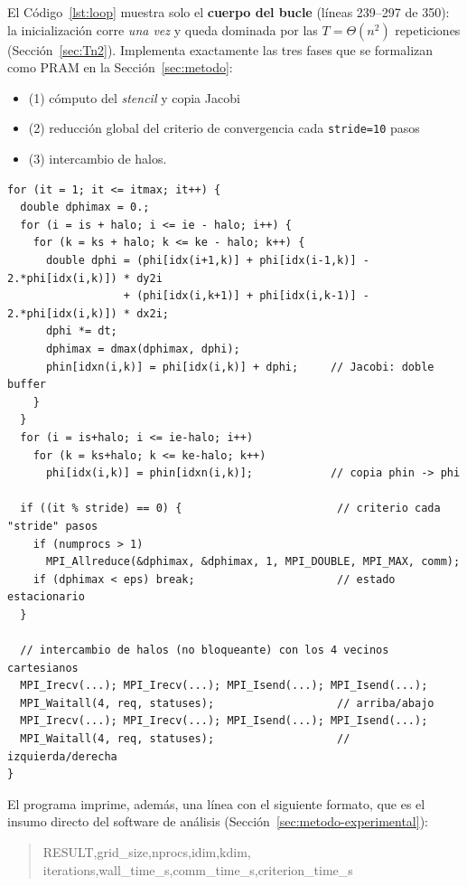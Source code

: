 \documentclass[11pt,a4paper]{article}
\begin{document}
	El Código~\ref{lst:loop} muestra solo el \textbf{cuerpo del bucle} (líneas
	239--297 de 350): la inicialización corre \emph{una vez} y queda dominada por
	las $T=\Theta(n^2)$ repeticiones (Sección~\ref{sec:Tn2}). Implementa
	exactamente las tres fases que se formalizan como PRAM en la
	Sección~\ref{sec:metodo}:
	\begin{itemize}
		\item (1) cómputo del \textit{stencil} y copia Jacobi
		\item (2) reducción global del criterio de convergencia	cada \texttt{stride=10} pasos
		\item (3) intercambio de halos.
	\end{itemize}


	\begin{lstlisting}[style=cppstyle, caption={Núcleo del bucle de iteración (\texttt{src/heat-mpi-big.c}, líneas 239--297, abreviado).}, label={lst:loop}]
for (it = 1; it <= itmax; it++) {
  double dphimax = 0.;
  for (i = is + halo; i <= ie - halo; i++) {
    for (k = ks + halo; k <= ke - halo; k++) {
      double dphi = (phi[idx(i+1,k)] + phi[idx(i-1,k)] - 2.*phi[idx(i,k)]) * dy2i
                  + (phi[idx(i,k+1)] + phi[idx(i,k-1)] - 2.*phi[idx(i,k)]) * dx2i;
      dphi *= dt;
      dphimax = dmax(dphimax, dphi);
      phin[idxn(i,k)] = phi[idx(i,k)] + dphi;     // Jacobi: doble buffer
    }
  }
  for (i = is+halo; i <= ie-halo; i++)
    for (k = ks+halo; k <= ke-halo; k++)
      phi[idx(i,k)] = phin[idxn(i,k)];            // copia phin -> phi

  if ((it % stride) == 0) {                        // criterio cada "stride" pasos
    if (numprocs > 1)
      MPI_Allreduce(&dphimax, &dphimax, 1, MPI_DOUBLE, MPI_MAX, comm);
    if (dphimax < eps) break;                      // estado estacionario
  }

  // intercambio de halos (no bloqueante) con los 4 vecinos cartesianos
  MPI_Irecv(...); MPI_Irecv(...); MPI_Isend(...); MPI_Isend(...);
  MPI_Waitall(4, req, statuses);                   // arriba/abajo
  MPI_Irecv(...); MPI_Irecv(...); MPI_Isend(...); MPI_Isend(...);
  MPI_Waitall(4, req, statuses);                   // izquierda/derecha
}
	\end{lstlisting}

	El programa imprime, además, una línea con el siguiente formato, que es el
	insumo directo del software de análisis (Sección~\ref{sec:metodo-experimental}):
	
	\begin{quote}
	\footnotesize\ttfamily
	RESULT,grid\_size,nprocs,idim,kdim,\\
	iterations,wall\_time\_s,comm\_time\_s,criterion\_time\_s
	\end{quote}
\end{document}
